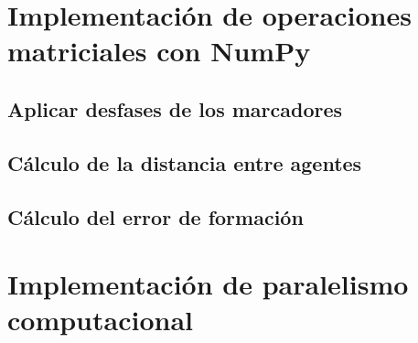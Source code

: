 \section{Implementación de operaciones matriciales con NumPy}
\subsection{Aplicar desfases de los marcadores}
\subsection{Cálculo de la distancia entre agentes}
\subsection{Cálculo del error de formación}

\section{Implementación de paralelismo computacional}





